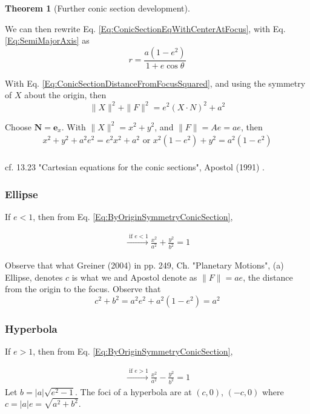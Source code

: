 \documentclass[10pt]{amsart}
\newtheorem{theorem}{Theorem}
\begin{document}
\begin{multicols*}{2}
\begin{theorem}[Further conic section development]
\end{theorem}

We can then rewrite Eq. \ref{Eq:ConicSectionEqWithCenterAtFocus}, with Eq. \ref{Eq:SemiMajorAxis} as
\[
\boxed{ r = \frac{ a(1-e^2) }{ 1 + e\cos{\theta} } }
\]

With Eq. \ref{Eq:ConicSectionDistanceFromFocusSquared}, and using the symmetry of $X$ about the origin, then
\[
\| X \|^2 + \| F \|^2 = e^2 (X\cdot N)^2 + a^2
\]

Choose $\mathbf{N} = \mathbf{e}_x$. With $\|X\|^2 = x^2 + y^2$, and $\|F\| = Ae = ae$, then
\begin{equation}\label{Eq:ByOriginSymmetryConicSection}
\begin{gathered}
x^2 + y^2 +a^2 e^2 = e^2 x^2 + a^2 \text{ or } x^2 ( 1 -e^2) + y^2 = a^2 ( 1-e^2) \\
\end{gathered}
\end{equation}

cf. 13.23 "Cartesian equations for the conic sections", Apostol (1991) \cite{Apos1991}.

\subsubsection{Ellipse}

If $e <1$, then from Eq. \ref{Eq:ByOriginSymmetryConicSection},

\[
\begin{gathered}
\xrightarrow{ \text{ if } e < 1 } \frac{x^2 }{ a^2 } + \frac{y^2}{b^2} = 1
\end{gathered}
\]

Observe that what  Greiner (2004) \cite{Grei2004} in pp. 249, Ch. "Planetary Motions", (a) Ellipse, denotes $c$ is what we and Apostol denote as $\|F \| =ae$, the distance from the origin to the focus. Observe that
\[
c^2 + b^2 = a^2 e^2 + a^2 (1-e^2) = a^2
\]

\subsubsection{Hyperbola}

If $e > 1$, then from Eq. \ref{Eq:ByOriginSymmetryConicSection},

\[
\begin{gathered}
\xrightarrow{ \text{ if } e > 1 } \frac{x^2 }{ a^2 } - \frac{y^2}{b^2} = 1
\end{gathered}
\]
Let $b = |a| \sqrt{ e^2 - 1}$. The foci of a hyperbola are at $(c,0)$, $(-c,0)$ where $c= |a| e = \sqrt{ a^2 + b^2}$. 


\end{multicols*}
\end{document}
